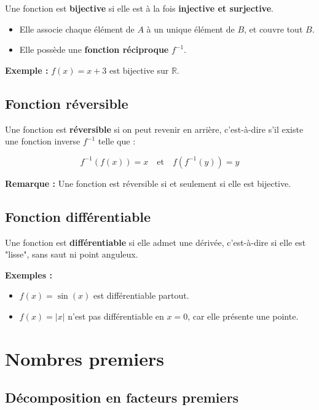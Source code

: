 \documentclass[12]{article}%
\theoremstyle{plain}
\theoremstyle{definition}
\theoremstyle{remark}
\begin{document}
Une fonction est \textbf{bijective} si elle est à la fois \textbf{injective et surjective}.

\begin{itemize}[label=--]
	\item Elle associe chaque élément de \( A \) à un unique élément de \( B \), et couvre tout \( B \).
	\item Elle possède une \textbf{fonction réciproque} \( f^{-1} \).
\end{itemize}

\textbf{Exemple :} \( f(x) = x + 3 \) est bijective sur \( \mathbb{R} \).

\vspace{0.5cm}

\subsection*{Fonction réversible}

Une fonction est \textbf{réversible} si on peut revenir en arrière, c'est-à-dire s’il existe une fonction inverse \( f^{-1} \) telle que :

\[
f^{-1}(f(x)) = x
\quad \text{et} \quad
f(f^{-1}(y)) = y
\]

\textbf{Remarque :} Une fonction est réversible si et seulement si elle est bijective.

\vspace{0.5cm}

\subsection*{Fonction différentiable}

Une fonction est \textbf{différentiable} si elle admet une dérivée, c’est-à-dire si elle est "lisse", sans saut ni point anguleux.

\textbf{Exemples :}
\begin{itemize}[label=--]
	\item \( f(x) = \sin(x) \) est différentiable partout.
	\item \( f(x) = |x| \) n'est pas différentiable en \( x = 0 \), car elle présente une pointe.
\end{itemize}

\newpage
\section{Nombres premiers}

\subsection{Décomposition en facteurs premiers}
\end{document}
